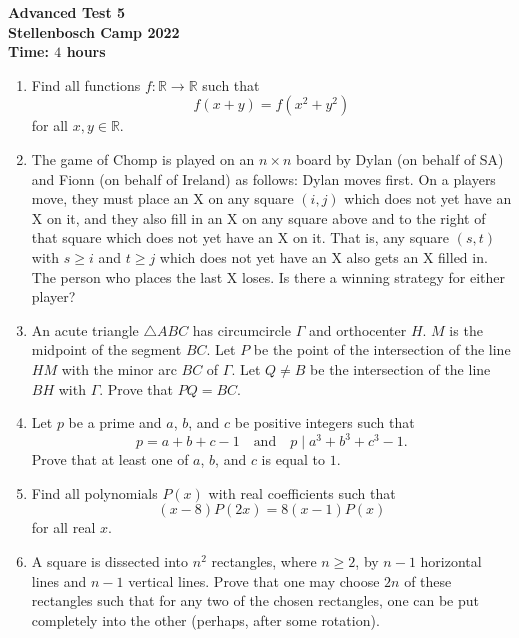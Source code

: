 \documentclass{article}
\begin{document}
\thispagestyle{empty}

\begin{center}
  \textbf{\Large Advanced Test 5}
  \\ \vspace{1em}
  \textbf{\large Stellenbosch Camp 2022}
  \\ \vspace{1em}
  \textbf{\large Time: $4$ hours}
\end{center}

\bigskip

\begin{enumerate}[itemsep=\fill]

\item %
Find all functions $f : \mathbb{R} \to \mathbb{R}$ such that \[ f(x+y) = f(x^2+y^2) \] for all $x,y \in \mathbb{R}$.

 
\item %
The game of Chomp is played on an $n \times n$ board by Dylan (on behalf of SA) and Fionn (on behalf of Ireland) as follows: Dylan moves first.
On a players move, they must place an X on any square $(i, j)$ which does not yet have an X on it, and they also fill in an X on any square above and to the right of that square which does not yet have an X on it.
That is, any square $(s, t)$ with $s \geq i$ and $t \geq j$ which does not yet have an X also gets an X filled in.
The person who places the last X loses.
Is there a winning strategy for either player?


\item %
An acute triangle $\triangle ABC$ has circumcircle $\Gamma$ and orthocenter $H$.
$M$ is the midpoint of the segment $BC$.
Let $P$ be the point of the intersection of the line $HM$ with the minor arc $BC$ of $\Gamma$.
Let $Q \neq B$ be the intersection of the line $BH$ with $\Gamma$.
Prove that $PQ = BC$.


\item %
Let $p$ be a prime and $a$, $b$, and $c$ be positive integers such that
\[ p = a+b+c-1 \quad \text{and} \quad p \mid a^3+b^3+c^3-1. \]
Prove that at least one of $a$, $b$, and $c$ is equal to $1$.


\item %
Find all polynomials $P(x)$ with real coefficients such that
\[ (x-8)P(2x) = 8(x-1)P(x) \]
for all real $x$.


\item %
A square is dissected into $n^2$ rectangles, where $n\geq 2$, by $n-1$ horizontal lines and $n-1$ vertical lines.
Prove that one may choose $2n$ of these rectangles such that for any two of the chosen rectangles, one can be put completely into the other (perhaps, after some rotation).

\end{enumerate}
\end{document}
